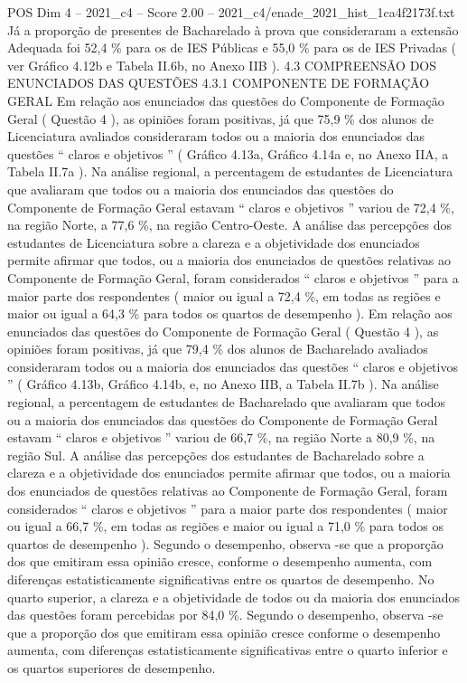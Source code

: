 \begin{textsample}{POS Dim 4 – 2021\_c4 – Score 2.00 – 2021\_c4/enade\_2021\_hist\_1ca4f2173f.txt}
Já a proporção de presentes de Bacharelado à prova que consideraram a extensão Adequada foi 52,4 \% para os de IES Públicas e 55,0 \% para os de IES Privadas ( ver Gráfico 4.12b e Tabela II.6b, no Anexo IIB ). 4.3 COMPREENSÃO DOS ENUNCIADOS DAS QUESTÕES 4.3.1 COMPONENTE DE FORMAÇÃO GERAL Em relação aos enunciados das questões do Componente de Formação Geral ( Questão 4 ), as opiniões foram positivas, já que 75,9 \% dos alunos de Licenciatura avaliados consideraram todos ou a maioria dos enunciados das questões “ claros e objetivos ” ( Gráfico 4.13a, Gráfico 4.14a e, no Anexo IIA, a Tabela II.7a ).
Na análise regional, a percentagem de estudantes de Licenciatura que avaliaram que todos ou a maioria dos enunciados das questões do Componente de Formação Geral estavam “ claros e objetivos ” variou de 72,4 \%, na região Norte, a 77,6 \%, na região Centro-Oeste.
A análise das percepções dos estudantes de Licenciatura sobre a clareza e a objetividade dos enunciados permite afirmar que todos, ou a maioria dos enunciados de questões relativas ao Componente de Formação Geral, foram considerados “ claros e objetivos ” para a maior parte dos respondentes ( maior ou igual a 72,4 \%, em todas as regiões e maior ou igual a 64,3 \% para todos os quartos de desempenho ).
Em relação aos enunciados das questões do Componente de Formação Geral ( Questão 4 ), as opiniões foram positivas, já que 79,4 \% dos alunos de Bacharelado avaliados consideraram todos ou a maioria dos enunciados das questões “ claros e objetivos ” ( Gráfico 4.13b, Gráfico 4.14b, e, no Anexo IIB, a Tabela II.7b ).
Na análise regional, a percentagem de estudantes de Bacharelado que avaliaram que todos ou a maioria dos enunciados das questões do Componente de Formação Geral estavam “ claros e objetivos ” variou de 66,7 \%, na região Norte a 80,9 \%, na região Sul.
A análise das percepções dos estudantes de Bacharelado sobre a clareza e a objetividade dos enunciados permite afirmar que todos, ou a maioria dos enunciados de questões relativas ao Componente de Formação Geral, foram considerados “ claros e objetivos ” para a maior parte dos respondentes ( maior ou igual a 66,7 \%, em todas as regiões e maior ou igual a 71,0 \% para todos os quartos de desempenho ).
Segundo o desempenho, observa -se que a proporção dos que emitiram essa opinião cresce, conforme o desempenho aumenta, com diferenças estatisticamente significativas entre os quartos de desempenho.
No quarto superior, a clareza e a objetividade de todos ou da maioria dos enunciados das questões foram percebidas por 84,0 \%.
Segundo o desempenho, observa -se que a proporção dos que emitiram essa opinião cresce conforme o desempenho aumenta, com diferenças estatisticamente significativas entre o quarto inferior e os quartos superiores de desempenho.

\end{textsample}
